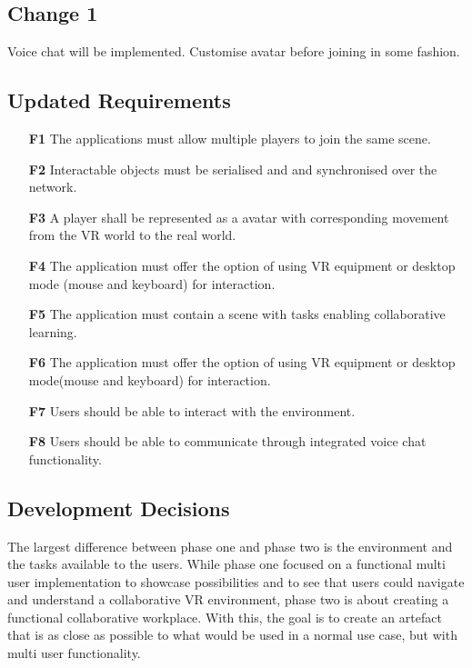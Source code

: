 \subsection{Change 1}
Voice chat will be implemented. Customise avatar before joining in some fashion.

\subsection{Updated Requirements}

\begin{enumerate}
  \setlength\itemsep{0em}
  \item [\textbf{F1}] The applications must allow multiple players to join the same scene.
  \item [\textbf{F2}] Interactable objects must be serialised and and synchronised over the network.
  \item [\textbf{F3}] A player shall be represented as a avatar with corresponding movement from the VR world to the real world.
  \item [\textbf{F4}] The application must offer the option of using VR equipment or desktop mode (mouse and keyboard) for interaction.
  \item [\textbf{F5}] The application must contain a scene with tasks enabling collaborative learning.
  \item [\textbf{F6}] The application must offer the option of using VR equipment or desktop mode(mouse and keyboard) for interaction.
  \item [\textbf{F7}] Users should be able to interact with the environment.
  \item [\textbf{F8}] Users should be able to communicate through integrated voice chat functionality.
\end{enumerate}

\subsection{Development Decisions}
The largest difference between phase one and phase two is the environment and the tasks available to the users. While phase one focused on a functional multi user implementation to showcase possibilities and to see that users could navigate and understand a collaborative VR environment, phase two is about creating a functional collaborative workplace. With this, the goal is to create an artefact that is as close as possible to what would be used in a normal use case, but with multi user functionality. 

